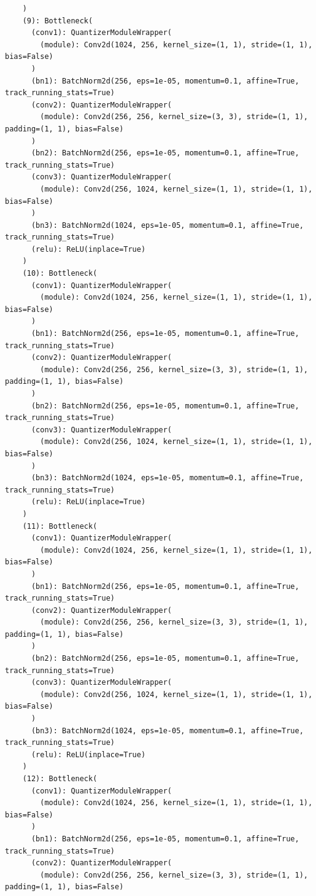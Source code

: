 \documentclass{article}
\begin{document}
\begin{verbatim}
    )
    (9): Bottleneck(
      (conv1): QuantizerModuleWrapper(
        (module): Conv2d(1024, 256, kernel_size=(1, 1), stride=(1, 1), bias=False)
      )
      (bn1): BatchNorm2d(256, eps=1e-05, momentum=0.1, affine=True, track_running_stats=True)
      (conv2): QuantizerModuleWrapper(
        (module): Conv2d(256, 256, kernel_size=(3, 3), stride=(1, 1), padding=(1, 1), bias=False)
      )
      (bn2): BatchNorm2d(256, eps=1e-05, momentum=0.1, affine=True, track_running_stats=True)
      (conv3): QuantizerModuleWrapper(
        (module): Conv2d(256, 1024, kernel_size=(1, 1), stride=(1, 1), bias=False)
      )
      (bn3): BatchNorm2d(1024, eps=1e-05, momentum=0.1, affine=True, track_running_stats=True)
      (relu): ReLU(inplace=True)
    )
    (10): Bottleneck(
      (conv1): QuantizerModuleWrapper(
        (module): Conv2d(1024, 256, kernel_size=(1, 1), stride=(1, 1), bias=False)
      )
      (bn1): BatchNorm2d(256, eps=1e-05, momentum=0.1, affine=True, track_running_stats=True)
      (conv2): QuantizerModuleWrapper(
        (module): Conv2d(256, 256, kernel_size=(3, 3), stride=(1, 1), padding=(1, 1), bias=False)
      )
      (bn2): BatchNorm2d(256, eps=1e-05, momentum=0.1, affine=True, track_running_stats=True)
      (conv3): QuantizerModuleWrapper(
        (module): Conv2d(256, 1024, kernel_size=(1, 1), stride=(1, 1), bias=False)
      )
      (bn3): BatchNorm2d(1024, eps=1e-05, momentum=0.1, affine=True, track_running_stats=True)
      (relu): ReLU(inplace=True)
    )
    (11): Bottleneck(
      (conv1): QuantizerModuleWrapper(
        (module): Conv2d(1024, 256, kernel_size=(1, 1), stride=(1, 1), bias=False)
      )
      (bn1): BatchNorm2d(256, eps=1e-05, momentum=0.1, affine=True, track_running_stats=True)
      (conv2): QuantizerModuleWrapper(
        (module): Conv2d(256, 256, kernel_size=(3, 3), stride=(1, 1), padding=(1, 1), bias=False)
      )
      (bn2): BatchNorm2d(256, eps=1e-05, momentum=0.1, affine=True, track_running_stats=True)
      (conv3): QuantizerModuleWrapper(
        (module): Conv2d(256, 1024, kernel_size=(1, 1), stride=(1, 1), bias=False)
      )
      (bn3): BatchNorm2d(1024, eps=1e-05, momentum=0.1, affine=True, track_running_stats=True)
      (relu): ReLU(inplace=True)
    )
    (12): Bottleneck(
      (conv1): QuantizerModuleWrapper(
        (module): Conv2d(1024, 256, kernel_size=(1, 1), stride=(1, 1), bias=False)
      )
      (bn1): BatchNorm2d(256, eps=1e-05, momentum=0.1, affine=True, track_running_stats=True)
      (conv2): QuantizerModuleWrapper(
        (module): Conv2d(256, 256, kernel_size=(3, 3), stride=(1, 1), padding=(1, 1), bias=False)

\end{verbatim}
\end{document}
